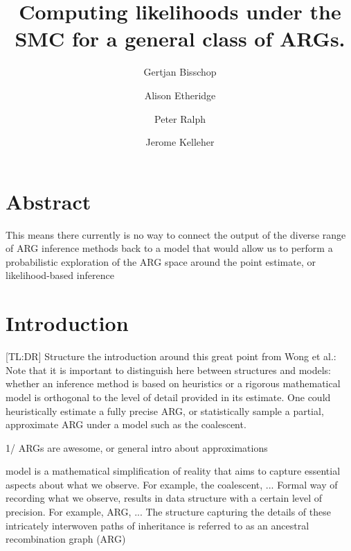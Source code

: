 \documentclass{article}
\begin{document}
\linenumbers
\title{Computing likelihoods under the SMC for a general class of ARGs.}

\author[1, $\dagger$]{Gertjan Bisschop}

\author[2]{Alison Etheridge}
\author[3]{Peter Ralph}

\author[1]{Jerome Kelleher}

\maketitle


\section{Abstract}
This means there currently is no way to connect the output of the diverse 
range of ARG inference methods back 
to a model that would allow us to perform a probabilistic exploration of the 
ARG space around the point estimate, or likelihood-based inference

\section{Introduction}

[TL:DR] Structure the introduction around this great point from Wong et al.:
Note that it is important to distinguish here between structures and models: 
whether an inference method is based on 
heuristics or a rigorous mathematical model is orthogonal to the level 
of detail provided in its estimate. One could heuristically estimate a 
fully precise ARG, or statistically sample a partial, approximate ARG under 
a model such as the coalescent.


1/ ARGs are awesome, or general intro about approximations


model is a mathematical simplification of reality that aims to capture essential aspects 
about what we observe.
For example, the coalescent, ...
Formal way of recording what we observe, results in data structure 
with a certain level of precision.
For example, ARG, ...
The structure capturing the details of these intricately 
interwoven paths of inheritance is referred to as an ancestral recombination graph (ARG)
\end{document}
